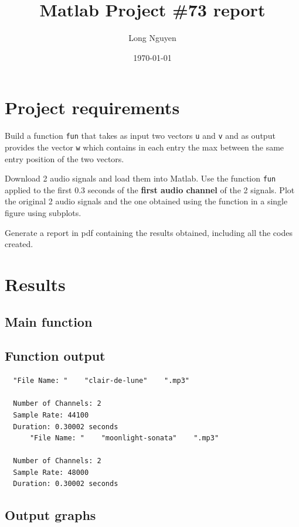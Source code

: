 \documentclass[a4paper,12pt]{article}
\title{Matlab Project \#73 report}
\date{\today}
\author{Long Nguyen}
\begin{document}


\maketitle

\section{Project requirements}

Build a function \verb|fun| that takes as input two vectors \verb|u| and \verb|v|
and as output provides the vector \verb|w| which contains in each entry
the max between the same entry position of the two vectors.

Download 2 audio signals and load them into Matlab.
Use the function \verb|fun| applied to the first 0.3 seconds of the
\textbf{first audio channel} of the 2 signals.
Plot the original 2 audio signals and the one obtained using the
function in a single figure using subplots.

Generate a report in pdf containing the results obtained,
including all the codes created.

\section{Results}

\subsection*{Main function}


\subsection*{Function output}
\begin{verbatim}
  "File Name: "    "clair-de-lune"    ".mp3"

  Number of Channels: 2
  Sample Rate: 44100
  Duration: 0.30002 seconds
      "File Name: "    "moonlight-sonata"    ".mp3"
  
  Number of Channels: 2
  Sample Rate: 48000
  Duration: 0.30002 seconds
\end{verbatim}

\subsection*{Output graphs}
\end{document}
